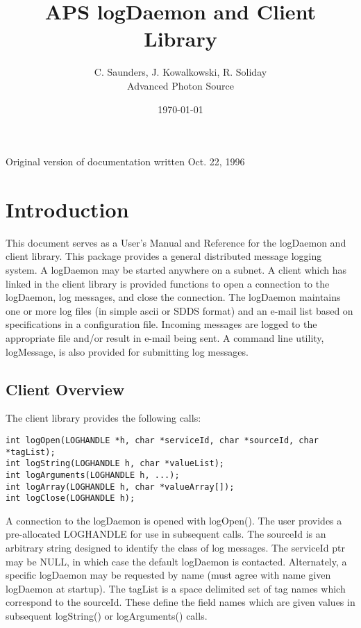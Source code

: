 \documentclass[11pt]{article}
\begin{document}
\title{APS logDaemon and Client Library}
\author{C. Saunders, J. Kowalkowski, R. Soliday\\Advanced Photon Source}
\date{\today}
\maketitle

\begin{center}
Original version of documentation written Oct. 22, 1996
\end{center}

\section{Introduction}

This document serves as a User's Manual and Reference for the logDaemon and client library. This package provides a general distributed message logging system. A logDaemon may be started anywhere on a subnet. A client which has linked in the client library is provided functions to open a connection to the logDaemon, log messages, and close the connection. The logDaemon maintains one or more log files (in simple ascii or SDDS format) and an e-mail list based on specifications in a configuration file. Incoming messages are logged to the appropriate file and/or result in e-mail being sent. A command line utility, logMessage, is also provided for submitting log messages.

\subsection{Client Overview}

The client library provides the following calls:

\begin{verbatim}
int logOpen(LOGHANDLE *h, char *serviceId, char *sourceId, char *tagList);
int logString(LOGHANDLE h, char *valueList);
int logArguments(LOGHANDLE h, ...);
int logArray(LOGHANDLE h, char *valueArray[]);
int logClose(LOGHANDLE h);
\end{verbatim}

A connection to the logDaemon is opened with logOpen(). The user provides a pre-allocated LOGHANDLE for use in subsequent calls. The sourceId is an arbitrary string designed to identify the class of log messages. The serviceId ptr may be NULL, in which case the default logDaemon is contacted. Alternately, a specific logDaemon may be requested by name (must agree with name given logDaemon at startup). The tagList is a space delimited set of tag names which correspond to the sourceId. These define the field names which are given values in subsequent logString() or logArguments() calls.
\end{document}
